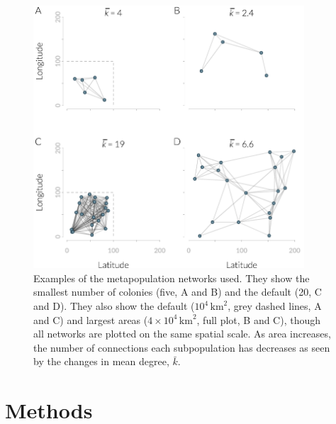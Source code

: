 \begin{knitrout}\footnotesize
{}\color{fgcolor}\begin{figure}[t]

{\centering \includegraphics[width=0.9\textwidth]{figure/colonyNetworkPlots-1} 

}

\caption[Example metapopulation networks]{
Examples of the metapopulation networks used.
They show the smallest number of colonies (five, A and B) and the default (20, C and D).
They also show the default ($10^4\,\text{km}^2$, grey dashed lines, A and C) and largest areas ($4\times10^4\,\text{km}^2$, full plot, B and C), though all networks are plotted on the same spatial scale.
As area increases, the number of connections each subpopulation has decreases as seen by the changes in mean degree, $\bar{k}$.
}\label{fig:colonyNetworkPlots}
\end{figure}


\end{knitrout}






\section{Methods}

